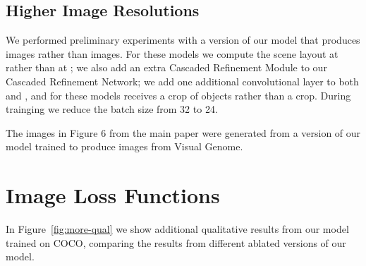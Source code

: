 \documentclass[10pt,twocolumn,letterpaper]{article}
\begin{document}
\subsection{Higher Image Resolutions}
We performed preliminary experiments with a version of our model that produces 
images rather than  images. For these models we compute the scene layout at 
rather than at ; we also add an extra Cascaded Refinement Module to our Cascaded Refinement
Network; we add one additional convolutional layer to both  and , and for these
models  receives a  crop of objects rather than a  crop. During trainging
we reduce the batch size from 32 to 24.

The images in Figure 6 from the main paper were generated from a version of our model trained to
produce  images from Visual Genome.

\begin{table}
  \centering
  \setlength{\tabcolsep}{1mm}
  \vspace{1mm}
  \caption{
    Architecture of our image discriminator . The input to the image discriminator
    is either a real or fake image, and it classifies an overlapping  grid of
    patches in the input image as either real or fake. All but the final convolution have
    a stride of 2, and all convolutions use no padding. LeakyReLU uses a negative slope of 0.2.
  }
  \label{tab:discriminator-img}
\end{table}

\section{Image Loss Functions}
In Figure~\ref{fig:more-qual} we show additional qualitative results from our model trained
on COCO, comparing the results from different ablated versions of our model.
\end{document}
